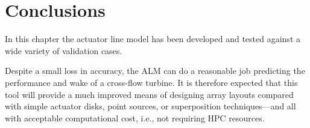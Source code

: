 \section{Conclusions}

In this chapter the actuator line model has been developed and tested against a
wide variety of validation cases.

Despite a small loss in accuracy, the ALM can do a reasonable job predicting the
performance and wake of a cross-flow turbine. It is therefore expected that this
tool will provide a much improved means of designing array layouts compared with
simple actuator disks, point sources, or superposition techniques---and all with
acceptable computational cost, i.e., not requiring HPC resources.